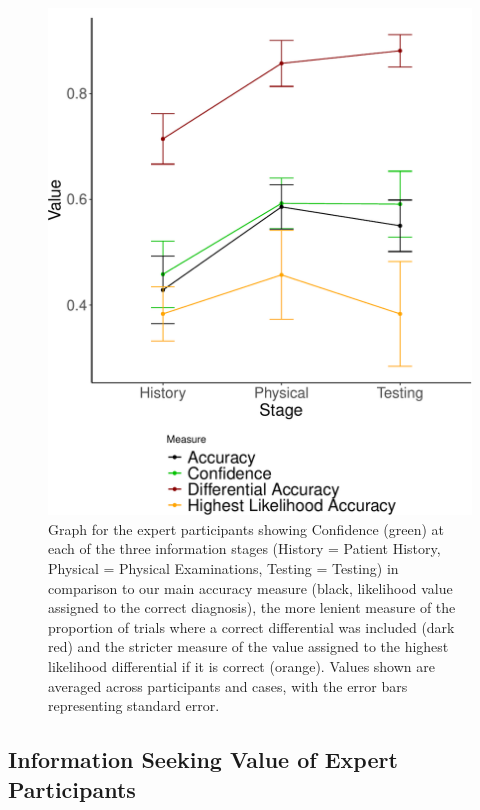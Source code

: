 \documentclass[a4paper, nobind]{templates/ociamthesis}
\begin{document}
\newpage

\begin{figure}[H]

{\centering \includegraphics[width=1\linewidth]{_main_files/figure-latex/meyerGraphExp-1} 

}

\caption[Online Study Appendix: Expert Participants' Confidence and Accuracy Across Stages]{Graph for the expert participants showing Confidence (green) at each of the three information stages (History = Patient History, Physical = Physical Examinations, Testing = Testing) in comparison to our main accuracy measure (black, likelihood value assigned to the correct diagnosis), the more lenient measure of the proportion of trials where a correct differential was included (dark red) and the stricter measure of the value assigned to the highest likelihood differential if it is correct (orange). Values shown are averaged across participants and cases, with the error bars representing standard error.}\label{fig:meyerGraphExp}
\end{figure}

\subsection{Information Seeking Value of Expert Participants}\label{information-seeking-value-of-expert-participants}
\end{document}
